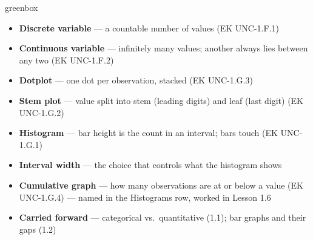 \documentclass[10pt]{article}
\begin{document}
\boxguard
\begin{skillbox}{greenbox}
\begin{minipage}[t]{0.48\linewidth}
    \begin{itemize}
        \item \textbf{Discrete variable} --- a countable number of values (EK UNC-1.F.1)
        \item \textbf{Continuous variable} --- infinitely many values; another always lies
              between any two (EK UNC-1.F.2)
        \item \textbf{Dotplot} --- one dot per observation, stacked (EK UNC-1.G.3)
        \item \textbf{Stem plot} --- value split into stem (leading digits) and leaf (last
              digit) (EK UNC-1.G.2)
    \end{itemize}
\end{minipage}
\hfill
\begin{minipage}[t]{0.48\linewidth}
    \begin{itemize}
        \item \textbf{Histogram} --- bar height is the count in an interval; bars touch
              (EK UNC-1.G.1)
        \item \textbf{Interval width} --- the choice that controls what the histogram shows
        \item \textbf{Cumulative graph} --- how many observations are at or below a value
              (EK UNC-1.G.4) --- named in the Histograms row, worked in Lesson 1.6
        \item \textbf{Carried forward} --- categorical vs.\ quantitative (1.1); bar graphs
              and their gaps (1.2)
    \end{itemize}
\end{minipage}
\end{skillbox}
\end{document}
